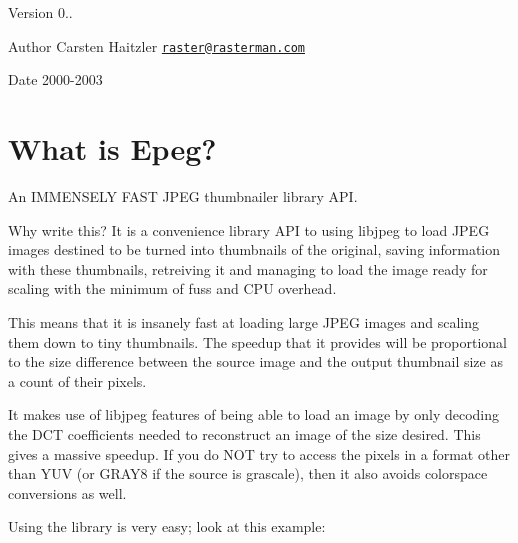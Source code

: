  \begin{DoxyVersion}{Version}
0.. 
\end{DoxyVersion}
\begin{DoxyAuthor}{Author}
Carsten Haitzler \href{mailto:raster@rasterman.com}{\tt raster@rasterman.\+com} 
\end{DoxyAuthor}
\begin{DoxyDate}{Date}
2000-\/2003
\end{DoxyDate}
\hypertarget{index_intro}{}\section{What is Epeg?}\label{index_intro}
An I\+M\+M\+E\+N\+S\+E\+L\+Y F\+A\+S\+T J\+P\+E\+G thumbnailer library A\+P\+I.

Why write this? It is a convenience library A\+P\+I to using libjpeg to load J\+P\+E\+G images destined to be turned into thumbnails of the original, saving information with these thumbnails, retreiving it and managing to load the image ready for scaling with the minimum of fuss and C\+P\+U overhead.

This means that it is insanely fast at loading large J\+P\+E\+G images and scaling them down to tiny thumbnails. The speedup that it provides will be proportional to the size difference between the source image and the output thumbnail size as a count of their pixels.

It makes use of libjpeg features of being able to load an image by only decoding the D\+C\+T coefficients needed to reconstruct an image of the size desired. This gives a massive speedup. If you do N\+O\+T try to access the pixels in a format other than Y\+U\+V (or G\+R\+A\+Y8 if the source is grascale), then it also avoids colorspace conversions as well.

Using the library is very easy; look at this example\+:




